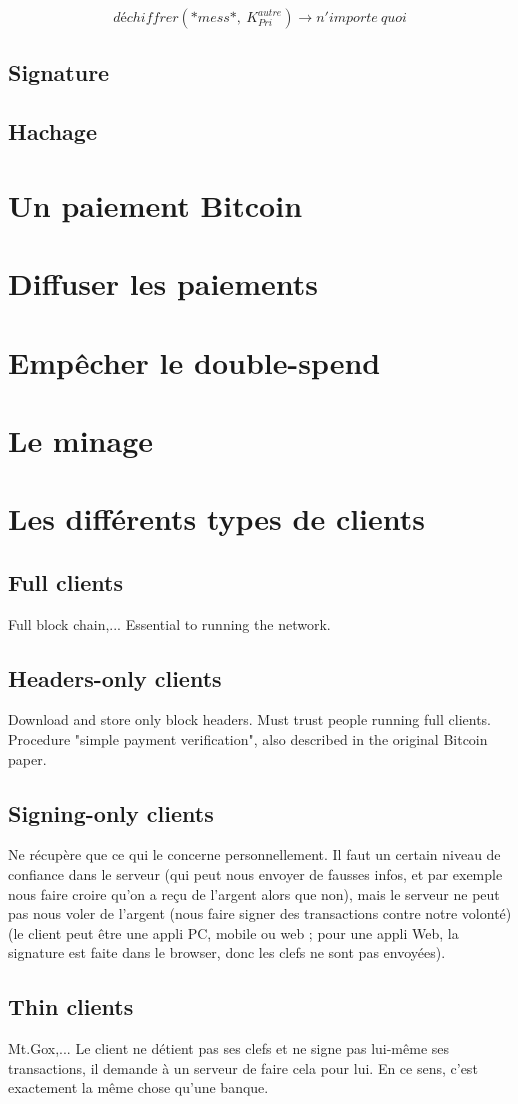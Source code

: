 \documentclass[11pt,a4paper]{article}
\begin{document}
$$déchiffrer(*mess*, ~K_{Pri}^{autre}) \rightarrow n'importe~quoi$$


\subsection{Signature}
\subsection{Hachage}

\section{Un paiement Bitcoin}

\section{Diffuser les paiements}

\section{Empêcher le double-spend}

\section{Le minage}
\section{Les différents types de clients}
\subsection{Full clients}
Full block chain,... Essential to running the network.
\subsection{Headers-only clients}
Download and store only block headers. Must trust people running full clients.
Procedure "simple payment verification", also described in the original Bitcoin paper.
\subsection{Signing-only clients}
Ne récupère que ce qui le concerne personnellement.
Il faut un certain niveau de confiance dans le serveur (qui peut nous envoyer de fausses infos, et par exemple nous faire croire qu'on a reçu de l'argent alors que non), mais le serveur ne peut pas nous voler de l'argent (nous faire signer des transactions contre notre volonté) (le client peut être une appli PC, mobile ou web ; pour une appli Web, la signature est faite dans le browser, donc les clefs ne sont pas envoyées).

\subsection{Thin clients}
Mt.Gox,...
Le client ne détient pas ses clefs et ne signe pas lui-même ses transactions, il demande à un serveur de faire cela pour lui. En ce sens, c'est exactement la même chose qu'une banque.
{}

\end{document}
